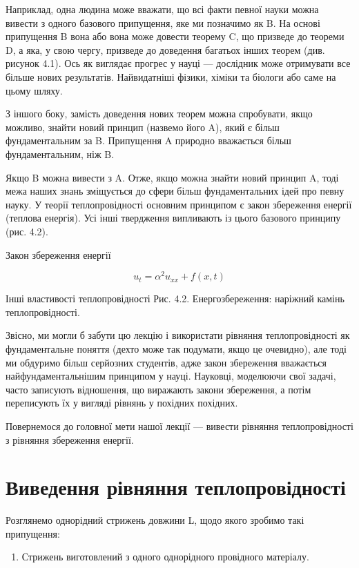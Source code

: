 \documentclass[
  ukrainian,
]{article}
\providecommand{\tightlist}{%
  \setlength{\itemsep}{0pt}\setlength{\parskip}{0pt}}
\begin{document}
Наприклад, одна людина може вважати, що всі факти певної науки можна
вивести з одного базового припущення, яке ми позначимо як B. На основі
припущення B вона або вона може довести теорему C, що призведе до
теореми D, а яка, у свою чергу, призведе до доведення багатьох інших
теорем (див. рисунок 4.1). Ось як виглядає прогрес у науці --- дослідник
може отримувати все більше нових результатів. Найвидатніші фізики,
хіміки та біологи або саме на цьому шляху.

З іншого боку, замість доведення нових теорем можна спробувати, якщо
можливо, знайти новий принцип (назвемо його A), який є більш
фундаментальним за B. Припущення A природно вважається більш
фундаментальним, ніж B.

Якщо B можна вивести з A. Отже, якщо можна знайти новий принцип A, тоді
межа наших знань зміщується до сфери більш фундаментальних ідей про
певну науку. У теорії теплопровідності основним принципом є закон
збереження енергії (теплова енергія). Усі інші твердження випливають із
цього базового принципу (рис. 4.2).

Закон збереження енергії

\[u_t = \alpha^2 u_{xx} + f(x,t)\]

Інші властивості теплопровідності Рис. 4.2. Енергозбереження: наріжний
камінь теплопровідності.

Звісно, ми могли б забути цю лекцію і використати рівняння
теплопровідності як фундаментальне поняття (дехто може так подумати,
якщо це очевидно), але тоді ми обдуримо більш серйозних студентів, адже
закон збереження вважається найфундаментальнішим принципом у науці.
Науковці, моделюючи свої задачі, часто записують відношення, що
виражають закони збереження, а потім переписують їх у вигляді рівнянь у
похідних похідних.

Повернемося до головної мети нашої лекції --- вивести рівняння
теплопровідності з рівняння збереження енергії.

\section{Виведення рівняння
теплопровідності}\label{ux432ux438ux432ux435ux434ux435ux43dux43dux44f-ux440ux456ux432ux43dux44fux43dux43dux44f-ux442ux435ux43fux43bux43eux43fux440ux43eux432ux456ux434ux43dux43eux441ux442ux456-1}

Розглянемо однорідний стрижень довжини L, щодо якого зробимо такі
припущення:

\begin{enumerate}
\def\labelenumi{\arabic{enumi}.}
\tightlist
\item
  Стрижень виготовлений з одного однорідного провідного матеріалу.
\end{enumerate}
\end{document}
